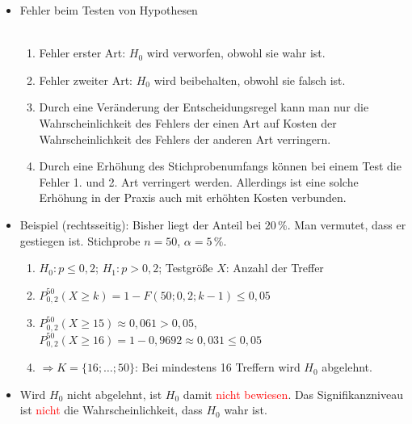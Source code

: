 \begin{itemize}
\item Fehler beim Testen von Hypothesen\\ 
\\
\begin{enumerate}
\item Fehler erster Art: $H_0$ wird verworfen, obwohl sie wahr ist. \\
\item Fehler zweiter Art: $H_0$ wird beibehalten, obwohl sie falsch ist.\\
\item Durch eine Veränderung der Entscheidungsregel kann man nur die Wahrscheinlichkeit
des Fehlers der einen Art auf Kosten der Wahrscheinlichkeit des Fehlers der anderen Art verringern.\\
\item Durch eine Erhöhung des Stichprobenumfangs können bei einem Test die Fehler
1. und 2. Art verringert werden. Allerdings ist eine solche Erhöhung in der Praxis auch mit erhöhten Kosten verbunden.
\end{enumerate}
\item Beispiel (rechtsseitig): Bisher liegt der Anteil bei $20\,\%$. Man vermutet, dass er gestiegen ist. Stichprobe $n = 50$, $\alpha = 5\,\%$.\\
\begin{enumerate}
\item $H_0\colon p \leq 0{,}2$; \quad $H_1\colon p > 0{,}2$; \quad Testgröße $X$: Anzahl der Treffer\\
\item $P_{0{,}2}^{50}(X \geq k) = 1 - F(50;0{,}2;k-1) \leq 0{,}05$\\
\item $P_{0{,}2}^{50}(X \geq 15) \approx 0{,}061 > 0{,}05$, \quad $P_{0{,}2}^{50}(X \geq 16) = 1 - 0{,}9692 \approx 0{,}031 \leq 0{,}05$\\
\item $\Rightarrow K = \{16; \ldots; 50\}$: Bei mindestens 16 Treffern wird $H_0$ abgelehnt.
\end{enumerate}
\item \mynote Wird $H_0$ nicht abgelehnt, ist $H_0$ damit \textcolor{red}{nicht bewiesen}. Das Signifikanzniveau ist \textcolor{red}{nicht} die Wahrscheinlichkeit, dass $H_0$ wahr ist.
\end{itemize}
\notizenbisseitenende
